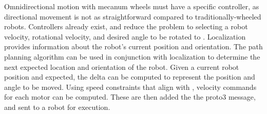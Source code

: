 Omnidirectional motion with mecanum wheels must have a specific controller, as directional movement is not as straightforward compared to traditionally-wheeled robots. Controllers already exist, and reduce the problem to selecting a robot velocity, rotational velocity, and desired angle to be rotated to \cite{mecanumcontrol}. Localization provides information about the robot's current position and orientation. The path planning algorithm can be used in conjunction with localization to determine the next expected location and orientation of the robot. Given a current robot position and expected, the delta can be computed to represent the position and angle to be moved. Using speed constraints that align with , velocity commands for each motor can be computed. These are then added the the proto3 message, and sent to a robot for execution.
